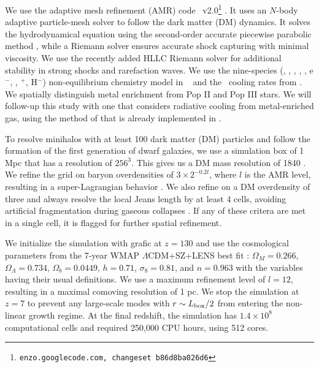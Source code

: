 \documentclass[apjl]{emulateapj}
\begin{document}
We use the adaptive mesh refinement (AMR) code
\enzo~v2.0\footnote{\texttt{enzo.googlecode.com, changeset
    b86d8ba026d6}} \citep{OShea2004}.  It uses an $N$-body adaptive
particle-mesh solver \citep{Efstathiou85} to follow the dark matter
(DM) dynamics.  It solves the hydrodynamical equation using the
second-order accurate piecewise parabolic method \citep{Woodward84,
  Bryan95}, while a Riemann solver ensures accurate shock capturing
with minimal viscosity.  We use the recently added HLLC Riemann solver
\citep{Toro94_HLLC} for additional stability in strong shocks and
rarefaction waves.  We use the nine-species (, ,
, , , e$^-$, \hh, \hh$^+$, H$^-$)
non-equilibrium chemistry model in \enzo~\citep{Abel97, Anninos97} and
the \hh~cooling rates from \citet{Glover08_Rates}.  We spatially
distinguish metal enrichment from Pop II and Pop III stars.  We will
follow-up this study with one that considers radiative cooling from
metal-enriched gas, using the method of \citet{2008MNRAS.385.1443S}
that is already implemented in \enzo.

To resolve minihalos with at least 100 dark matter (DM) particles and
follow the formation of the first generation of dwarf galaxies, we use
a simulation box of 1 Mpc that has a resolution of $256^3$.  This
gives us a DM mass resolution of 1840 \Ms.  We refine the grid on
baryon overdensities of $3 \times 2^{-0.2l}$, where $l$ is the AMR
level, resulting in a super-Lagrangian behavior \citep[also
  see][]{OShea08}.  We also refine on a DM overdensity of three and
always resolve the local Jeans length by at least 4 cells, avoiding
artificial fragmentation during gaseous collapses \citep{Truelove97}.
If any of these critera are met in a single cell, it is flagged for
further spatial refinement.

We initialize the simulation with grafic \citep{Bertschinger01} at $z
= 130$ and use the cosmological parameters from the 7-year WMAP
$\Lambda$CDM+SZ+LENS best fit \citep{WMAP7}: $\Omega_M = 0.266$,
$\Omega_\Lambda = 0.734$, $\Omega_b = 0.0449$, $h = 0.71$, $\sigma_8 =
0.81$, and $n = 0.963$ with the variables having their usual
definitions.  We use a maximum refinement level of $l = 12$, resulting
in a maximal comoving resolution of 1 pc.  We stop the simulation at
$z=7$ to prevent any large-scale modes with $r \sim L_{\rm box}/2$
from entering the non-linear growth regime.  At the final redshift,
the simulation has $1.4 \times 10^8$ computational cells and required
250,000 CPU hours, using 512 cores.
\end{document}
